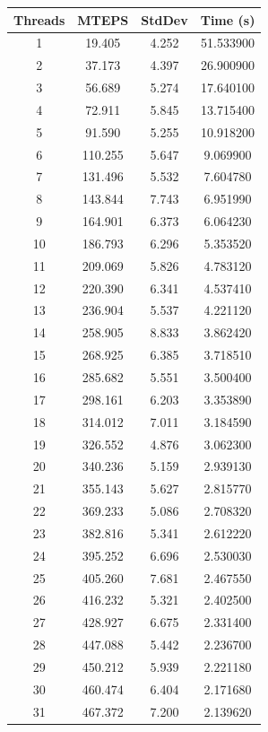 \documentclass[10pt,twocolumn,letterpaper]{article}
\begin{document}
\begin{table}[h]
\renewcommand\arraystretch{0.8}
\centering
\begin{tabular}{@{}c|ccc@{}}
\toprule
Threads          & MTEPS  & StdDev     & Time (s)      \\ \midrule
1 & 19.405 & 4.252 & 51.533900 \\
2 & 37.173 & 4.397 & 26.900900 \\
3 & 56.689 & 5.274 & 17.640100 \\
4 & 72.911 & 5.845 & 13.715400 \\
5 & 91.590 & 5.255 & 10.918200 \\
6 & 110.255 & 5.647 & 9.069900 \\
7 & 131.496 & 5.532 & 7.604780 \\
8 & 143.844 & 7.743 & 6.951990 \\
9 & 164.901 & 6.373 & 6.064230 \\
10 & 186.793 & 6.296 & 5.353520 \\
11 & 209.069 & 5.826 & 4.783120 \\
12 & 220.390 & 6.341 & 4.537410 \\
13 & 236.904 & 5.537 & 4.221120 \\
14 & 258.905 & 8.833 & 3.862420 \\
15 & 268.925 & 6.385 & 3.718510 \\
16 & 285.682 & 5.551 & 3.500400 \\
17 & 298.161 & 6.203 & 3.353890 \\
18 & 314.012 & 7.011 & 3.184590 \\
19 & 326.552 & 4.876 & 3.062300 \\
20 & 340.236 & 5.159 & 2.939130 \\
21 & 355.143 & 5.627 & 2.815770 \\
22 & 369.233 & 5.086 & 2.708320 \\
23 & 382.816 & 5.341 & 2.612220 \\
24 & 395.252 & 6.696 & 2.530030 \\
25 & 405.260 & 7.681 & 2.467550 \\
26 & 416.232 & 5.321 & 2.402500 \\
27 & 428.927 & 6.675 & 2.331400 \\
28 & 447.088 & 5.442 & 2.236700 \\
29 & 450.212 & 5.939 & 2.221180 \\
30 & 460.474 & 6.404 & 2.171680 \\
31 & 467.372 & 7.200 & 2.139620 \\

\end{tabular}
\end{table}
\end{document}
